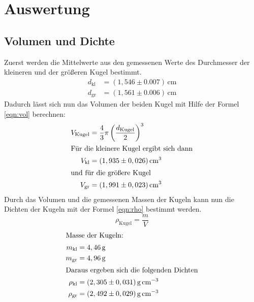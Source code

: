 \section{Auswertung}
\label{sec:Auswertung}
\subsection{Volumen und Dichte}
\label{sec:Vol und Dich}
Zuerst werden die Mittelwerte aus den gemessenen Werte des Durchmesser der kleineren und der größeren Kugel bestimmt.
\begin{align*}
d_\mathrm{kl}&=(1,546\pm0.007)\,\si{\centi\meter}\\
d_\mathrm{gr}&=(1,561\pm0.006)\,\si{\centi\meter}
\end{align*}
Dadurch lässt sich nun das Volumen der beiden Kugel mit Hilfe der Formel \eqref{eqn:vol}
berechnen:
\begin{align*}
V_{\mathrm{Kugel}}&=\frac{4}{3}\pi \left(\frac{d_{\mathrm{Kugel}}}{2}\right)^3\label{eqn:vol}\\
\intertext{Für die kleinere Kugel ergibt sich dann}
V_{\mathrm{kl}}&=(1,935\pm0,026)\,\si{\cubic\centi\meter}\\
\intertext{und für die größere Kugel}
V_\mathrm{gr}&=(1,991\pm0,023)\,\si{\cubic\centi\meter}
\end{align*}
Durch das Volumen und die gemessenen Massen der Kugeln kann nun die Dichten der Kugeln mit der Formel \eqref{eqn:rho}
bestimmt werden.
\begin{equation}
 \rho_{\mathrm{Kugel}}=\frac{m}{V}\label{eqn:rho}
\end{equation}
\begin{align*}
\intertext{Masse der Kugeln:}
m_{\mathrm{kl}}&=4,46\,\si{\gram}\\
m_{\mathrm{gr}}&=4,96\,\si{\gram}\\
\intertext{Daraus ergeben sich die folgenden Dichten}
\rho_{\mathrm{kl}}&=(2,305\pm0,031)\,\si{\gram\per\cubic\centi\meter}\\
\rho_{\mathrm{gr}}&=(2,492\pm0,029)\,\si{\gram\per\cubic\centi\meter}
\end{align*}
